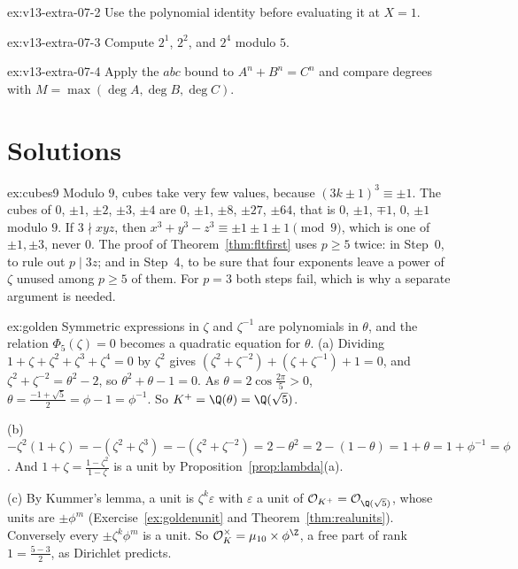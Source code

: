 \begin{hint}{ex:v13-extra-07-2}
Use the polynomial identity before evaluating it at $X=1$.
\end{hint}

\begin{hint}{ex:v13-extra-07-3}
Compute $2^1$, $2^2$, and $2^4$ modulo $5$.
\end{hint}

\begin{hint}{ex:v13-extra-07-4}
Apply the $abc$ bound to $A^n+B^n=C^n$ and compare degrees with $M=\max(\deg A,\deg B,\deg C)$.
\end{hint}

\section{Solutions}

\begin{solution}{ex:cubes9}
\idea Modulo $9$, cubes take very few values, because $(3k\pm1)^3\equiv\pm1$.
\writeup The cubes of $0$, $\pm1$, $\pm2$, $\pm3$, $\pm4$ are $0$, $\pm1$, $\pm8$, $\pm27$, $\pm64$, that is $0$, $\pm1$, $\mp1$, $0$,
$\pm1$ modulo $9$. If $3\nmid
xyz$, then $x^3+y^3-z^3\equiv\pm1\pm1\pm1\pmod9$, which is one of $\pm1,\pm3$, never $0$. The proof of
Theorem~\ref{thm:fltfirst} uses $p\ge5$ twice: in Step~0, to rule out $p\mid3z$; and in Step~4, to be sure that four exponents
leave a power of $\zeta$ unused among $p\ge5$ of them. For $p=3$ both steps fail, which is why a separate argument is needed.
\end{solution}

\begin{solution}{ex:golden}
\idea Symmetric expressions in $\zeta$ and $\zeta^{-1}$ are polynomials in $\theta$, and the relation $\Phi_5(\zeta)=0$ becomes a
quadratic equation for $\theta$.
\writeup (a) Dividing $1+\zeta+\zeta^2+\zeta^3+\zeta^4=0$ by $\zeta^2$ gives $(\zeta^2+\zeta^{-2})+(\zeta+\zeta^{-1})+1=0$, and
$\zeta^2+\zeta^{-2}=\theta^2-2$, so $\theta^2+\theta-1=0$. As $\theta=2\cos\frac{2\pi}5>0$, $\theta=\frac{-1+\sqrt5}2=\phi-1=
\phi^{-1}$. So $K^+=\Q(\theta)=\Q(\sqrt5)$.

(b) $-\zeta^2(1+\zeta)=-(\zeta^2+\zeta^3)=-(\zeta^2+\zeta^{-2})=2-\theta^2=2-(1-\theta)=1+\theta=1+\phi^{-1}=\phi$. And
$1+\zeta=\frac{1-\zeta^2}{1-\zeta}$ is a unit by Proposition~\ref{prop:lambda}(a).

(c) By Kummer's lemma, a unit is $\zeta^k\varepsilon$ with $\varepsilon$ a unit of $\mathcal O_{K^+}=\mathcal O_{\Q(\sqrt5)}$,
whose units are $\pm\phi^m$ (Exercise~\ref{ex:goldenunit} and Theorem~\ref{thm:realunits}). Conversely every $\pm\zeta^k\phi^m$ is a unit. So
$\mathcal O_K^\times=\mu_{10}\times\phi^{\Z}$, a free part of rank $1=\frac{5-3}2$, as Dirichlet predicts.
\end{solution}

